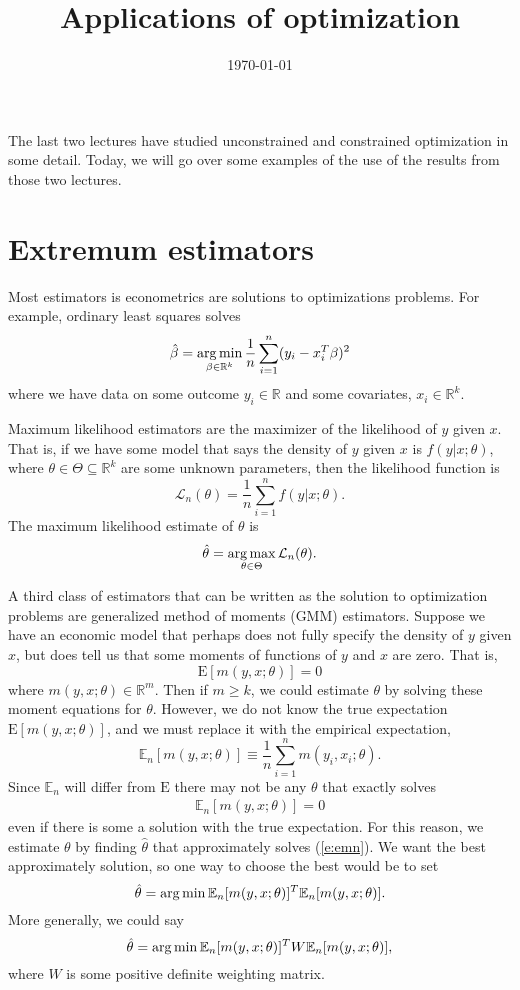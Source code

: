 \documentclass[12pt,reqno]{amsart}
\title{Applications of optimization}
\date{\today}
\theoremstyle{definition}
\newcommand{\argmax}{\operatornamewithlimits{arg\,max}}
\newcommand{\argmin}{\operatornamewithlimits{arg\,min}}
\def\R{\mathbb{R}}
\providecommand{\En}{\mathbb{E}_n}
\providecommand{\Er}{{\mathrm{E}}}
\begin{document}
\maketitle

The last two lectures have studied unconstrained and constrained
optimization in some detail. Today, we will go over some examples of
the use of the results from those two lectures.

\section{Extremum estimators}

Most estimators is econometrics are solutions to optimizations
problems. For example, ordinary least squares solves
\[ \hat{\beta} = \argmin_{\beta \in \R^k} \frac{1}{n} \sum_{i=1}^n
(y_i - x_i^T \beta)^2  \] 
where we have data on some outcome $y_i \in \R$ and some covariates,
$x_i \in \R^k$. 

Maximum likelihood estimators are the maximizer of the
likelihood of $y$ given $x$. That is, if we have some model that says
the density of $y$ given $x$ is $f(y|x;\theta)$, where $\theta \in
\Theta \subseteq \R^k$ are
some unknown parameters, then the likelihood function is
\[ \mathcal{L}_n(\theta) = \frac{1}{n} \sum_{i=1}^n f(y|x;\theta). \]
The maximum likelihood estimate of $\theta$ is
\[ \hat{\theta} = \argmax_{\theta \in \Theta}
\mathcal{L}_n(\theta). \] 

A third class of estimators that can be written as the solution to
optimization problems are generalized method of moments (GMM)
estimators. Suppose we have an economic model that perhaps does not
fully specify the density of $y$ given $x$, but does tell us that some
moments of functions of $y$ and $x$ are zero. That is,
\[ \Er[m(y,x;\theta)] = 0 \]
where $m(y,x;\theta) \in \R^m$. Then if $m \geq k$, we could estimate
$\theta$ by solving these moment equations for $\theta$. However, we
do not know the true expectation $\Er[m(y,x;\theta)]$, and we must
replace it with the empirical expectation,
\[ \En[m(y,x;\theta)] \equiv \frac{1}{n} \sum_{i=1}^n
m(y_i,x_i;\theta). \]
Since $\En$ will differ from $\Er$ there may not be any $\theta$ that
exactly solves 
\begin{align} \En[m(y,x;\theta)]=0 \label{e:emn} \end{align}
even if there is some a solution with the true expectation. For this
reason, we estimate $\theta$ by finding $\hat{\theta}$ that
approximately solves (\ref{e:emn}). We want the best approximately
solution, so one way to choose the best would be to set
\[ \hat{\theta} = \argmin \En[m(y,x;\theta)]^T \En[m(y,x;\theta)]. \]
More generally, we could say
\[ \hat{\theta} = \argmin \En[m(y,x;\theta)]^T W
\En[m(y,x;\theta)], \]
where $W$ is some positive definite weighting matrix. 
\end{document}

